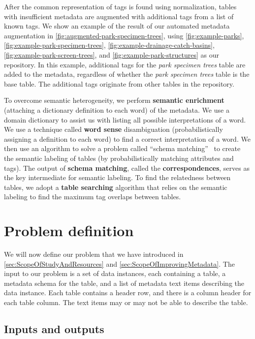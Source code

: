 After the common representation of tags is found using normalization, tables with insufficient metadata are augmented with additional tags from a list of known tags. We show an example of the result of our automated metadata augmentation in \autoref{fig:augmented-park-specimen-trees}, using \autoref{fig:example-parks}, \autoref{fig:example-park-specimen-trees}, \autoref{fig:example-drainage-catch-basins}, \autoref{fig:example-park-screen-trees}, and \autoref{fig:example-park-structures} as our repository. In this example, additional tags for the \textit{park specimen trees} table are added to the metadata, regardless of whether the \textit{park specimen trees} table is the base table. The additional tags originate from other tables in the repository.

To overcome semantic heterogeneity, we perform \textbf{\gls{semantic enrichment}} (attaching a dictionary definition to each word) of the metadata. We use a domain dictionary to assist us with listing all possible interpretations of a word. We use a technique called \textbf{\gls{word sense}} disambiguation (probabilistically assigning a definition to each word) to find a correct interpretation of a word. We then use an algorithm to solve a problem called ``schema matching''~\cite{Rahm2001Survey} to create the semantic labeling of tables (by probabilistically matching attributes and tags). The output of \textbf{\gls{schema matching}}, called the \textbf{\glspl{correspondence}}, serves as the key intermediate for semantic labeling. To find the relatedness between tables, we adopt a \textbf{\gls{table searching}} algorithm that relies on the semantic labeling to find the maximum tag overlaps between tables.

\section{Problem definition}
\label{sec:ProblemDefinition}

We will now define our problem that we have introduced in \autoref{sec:ScopeOfStudyAndResources} and \autoref{sec:ScopeOfImprovingMetadata}. The input to our problem is a set of data instances, each containing a table, a metadata schema for the table, and a list of metadata text items describing the data instance. Each table contains a header row, and there is a column header for each table column. The text items may or may not be able to describe the table.

\subsection{Inputs and outputs}

